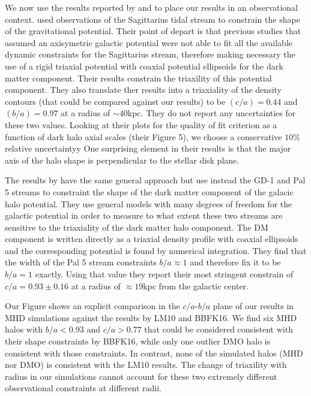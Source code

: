 \documentclass[a4paper,fleqn,usenatbib]{mnras}
\begin{document}
We now use the results reported by \cite{LM10} and \cite{Bovy16}
to place our results in an observational context.
\cite{LM10} used observations of the Sagittarius tidal stream to
constrain the shape of the gravitational potential.
Their point of depart is that previous studies that assumed an
axisymetric galactic potential were not able to fit all the available
dynamic constraints for the Sagittarius stream, therefore making
necessary the use of a rigid triaxial potential with coaxial potential
ellipsoids for the dark matter component.  
Their results constrain the triaxility of this potential
component. 
They also translate ther results into a triaxiality of the density
contours (that could be compared against our results)
 to be $(c/a)=0.44$ and $(b/a)=0.97$ at a radius of $\sim 40$kpc. 
They do not report any uncertainties for these two values. 
Looking at their plots for the quality of fit criterion as a function
of dark halo axial scales (their Figure 5), we choose a conservative $10\%$
relative uncertaintyy
One surprising element in their results is that  the major axis of the
halo shape is perpendicular to the stellar disk plane.  

The results by \cite{Bovy16} have the same general approach but use
instead the GD-1 \citep{2006ApJ...641L..37G} and Pal 5 \citep{2009AJ....137.3378O}
streams to constraint the shape of the dark matter component of the
galacic halo potential.
They use general models with many degrees of freedom for the galactic
potential in order to measure to what extent these two streams are sensitive
to the triaxiality of the dark matter halo component.
The DM component is written directly as a triaxial density profile
with coaxial ellipsoids and the corresponding potential is found by
numerical integration.
They find that the width of the Pal 5 stream constraints $b/a\approx
1$ and therefore fix it to be $b/a=1$ exactly.
Using that value they report their most stringent constrain of
$c/a=0.93\pm0.16$ at a radius of $\approx 19$kpc from the galactic
center. 

Our Figure \label{fig:observations} shows an explicit comparison in
the $c/a$-$b/a$ plane of our results in MHD simulations against the
results by LM10 and BBFK16.  
We find six MHD halos with $b/a<0.93$ and $c/a>0.77$ that could be
considered consistent with their shape constraints  by BBFK16, while
only one outlier DMO halo is consistent with those constraints.
In contrast, none of the simulated halos (MHD nor DMO) is consistent
with the LM10 results. 
The change of triaxility with radius in our simulations cannot account
for these two extremely different observational constraints at
different radii.
\end{document}
